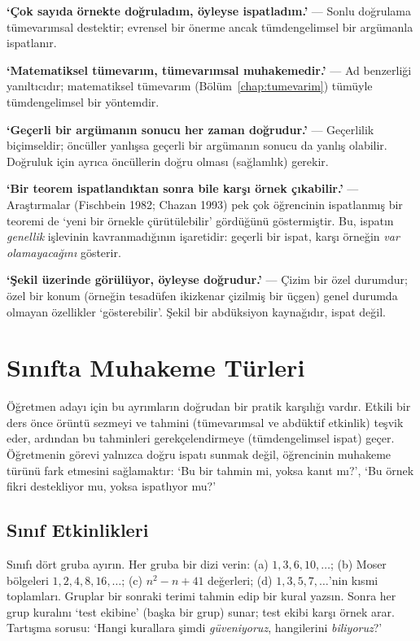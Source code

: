 \begin{yanilgi}
\textbf{‘Çok sayıda örnekte doğruladım, öyleyse ispatladım.’} — Sonlu doğrulama tümevarımsal destektir; evrensel bir önerme ancak tümdengelimsel bir argümanla ispatlanır.

\smallskip
\textbf{‘Matematiksel tümevarım, tümevarımsal muhakemedir.’} — Ad benzerliği yanıltıcıdır; matematiksel tümevarım (Bölüm~\ref{chap:tumevarim}) tümüyle tümdengelimsel bir yöntemdir.

\smallskip
\textbf{‘Geçerli bir argümanın sonucu her zaman doğrudur.’} — Geçerlilik biçimseldir; öncüller yanlışsa geçerli bir argümanın sonucu da yanlış olabilir. Doğruluk için ayrıca öncüllerin doğru olması (sağlamlık) gerekir.

\smallskip
\textbf{‘Bir teorem ispatlandıktan sonra bile karşı örnek çıkabilir.’} — Araştırmalar (Fischbein 1982; Chazan 1993) pek çok öğrencinin ispatlanmış bir teoremi de ‘yeni bir örnekle çürütülebilir’ gördüğünü göstermiştir. Bu, ispatın \emph{genellik} işlevinin kavranmadığının işaretidir: geçerli bir ispat, karşı örneğin \emph{var olamayacağını} gösterir.

\smallskip
\textbf{‘Şekil üzerinde görülüyor, öyleyse doğrudur.’} — Çizim bir özel durumdur; özel bir konum (örneğin tesadüfen ikizkenar çizilmiş bir üçgen) genel durumda olmayan özellikler ‘gösterebilir’. Şekil bir abdüksiyon kaynağıdır, ispat değil.
\end{yanilgi}

\section{Sınıfta Muhakeme Türleri}

Öğretmen adayı için bu ayrımların doğrudan bir pratik karşılığı vardır. Etkili bir ders önce örüntü sezmeyi ve tahmini (tümevarımsal ve abdüktif etkinlik) teşvik eder, ardından bu tahminleri gerekçelendirmeye (tümdengelimsel ispat) geçer. Öğretmenin görevi yalnızca doğru ispatı sunmak değil, öğrencinin muhakeme türünü fark etmesini sağlamaktır: ‘Bu bir tahmin mi, yoksa kanıt mı?’, ‘Bu örnek fikri destekliyor mu, yoksa ispatlıyor mu?’

\subsection{Sınıf Etkinlikleri}

\begin{sinif}
Sınıfı dört gruba ayırın. Her gruba bir dizi verin: (a) $1,3,6,10,\dots$; (b) Moser bölgeleri $1,2,4,8,16,\dots$; (c) $n^2-n+41$ değerleri; (d) $1,3,5,7,\dots$’nin kısmi toplamları. Gruplar bir sonraki terimi tahmin edip bir kural yazsın. Sonra her grup kuralını ‘test ekibine’ (başka bir grup) sunar; test ekibi karşı örnek arar. Tartışma sorusu: ‘Hangi kurallara şimdi \emph{güveniyoruz}, hangilerini \emph{biliyoruz}?’
\end{sinif}


